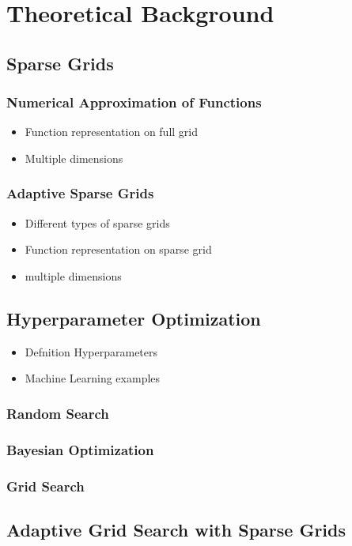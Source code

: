 
\chapter{Theoretical Background}\label{chapter:theoretical_background}


\section{Sparse Grids}

\subsection{Numerical Approximation of Functions}

\begin{itemize}
	\item Function representation on full grid
	\item Multiple dimensions
\end{itemize}

\subsection{Adaptive Sparse Grids}

\begin{itemize}
	\item Different types of sparse grids
	\item Function representation on sparse grid
	\item multiple dimensions
\end{itemize}

\section{Hyperparameter Optimization}

\begin{itemize}
	\item Defnition Hyperparameters
	\item Machine Learning examples
\end{itemize}

\subsection{Random Search}

\subsection{Bayesian Optimization}

\subsection{Grid Search}


\section{Adaptive Grid Search with Sparse Grids}